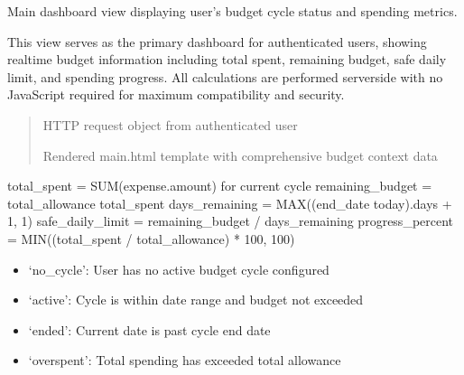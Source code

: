 \documentclass[letterpaper,10pt,english]{sphinxmanual}
\begin{document}
\begin{fulllineitems}
\label{\detokenize{softwareProject:softwareProject.views.home}}
\pysigstartsignatures
\pysiglinewithargsret
{}
{}
{}
\pysigstopsignatures
\sphinxAtStartPar
Main dashboard view displaying user’s budget cycle status and spending metrics.

\sphinxAtStartPar
This view serves as the primary dashboard for authenticated users, showing
real\sphinxhyphen{}time budget information including total spent, remaining budget,
safe daily limit, and spending progress. All calculations are performed
server\sphinxhyphen{}side with no JavaScript required for maximum compatibility and security.
\begin{quote}\begin{description}
\sphinxAtStartPar
{} \textendash{} HTTP request object from authenticated user

\sphinxAtStartPar
Rendered main.html template with comprehensive budget context data

\end{description}\end{quote}
\begin{description}
\sphinxAtStartPar
total\_spent = SUM(expense.amount) for current cycle
remaining\_budget = total\_allowance \sphinxhyphen{} total\_spent
days\_remaining = MAX((end\_date \sphinxhyphen{} today).days + 1, 1)
safe\_daily\_limit = remaining\_budget / days\_remaining
progress\_percent = MIN((total\_spent / total\_allowance) * 100, 100)

\begin{itemize}
\item {} 
\sphinxAtStartPar
‘no\_cycle’: User has no active budget cycle configured

\item {} 
\sphinxAtStartPar
‘active’: Cycle is within date range and budget not exceeded

\item {} 
\sphinxAtStartPar
‘ended’: Current date is past cycle end date

\item {} 
\sphinxAtStartPar
‘overspent’: Total spending has exceeded total allowance


\end{itemize}
\end{description}
\end{fulllineitems}
\end{document}
